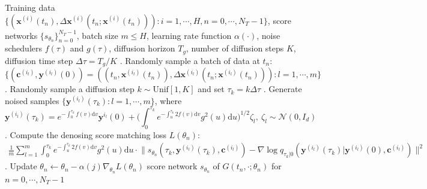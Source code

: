 \documentclass[11pt]{article}
\newcommand{\bx}{\mathbf{x}}
\newcommand{\by}{\mathbf{y}}
\newcommand{\bc}{\mathbf{c}}
\newcommand{\intd}{\mathrm{d}}
\begin{document}
\begin{algorithm}[H]
\small
\caption{Training process of the SDE generative model
$\{G(t_n, \cdot; \theta_n): n=0, \cdots, N_T - 1\}$}
\begin{algorithmic}\label{alg: training_process}
    \REQUIRE Training data $\{(\bx^{(i)}(t_n), \Delta\bx^{(i)}(t_n; \bx^{(i)}(t_n))): i=1,\cdots, H, n=0, \cdots, N_T - 1\}$, score networks $\{s_{\theta_n}\}_{n=0}^{N_T - 1}$, batch size $m\le H$, learning rate function $\alpha(\cdot)$, noise schedulers $f(\tau)$ and $g(\tau)$, diffusion horizon $T_g$, number of diffusion steps $K$, diffusion time step $\Delta\tau = T_g/K$
    . Randomly sample a batch of data at $t_n$:
    \vspace{-2mm}
        $$\big\{(\bc^{(i_l)}, \by^{(i_l)}(0)) = ((t_n, \bx^{(i_l)}(t_n)), \Delta\bx^{(i_l)}(t_n; \bx^{(i_l)}(t_n))): l=1,\cdots, m\big\}$$
    \vspace{-7mm}
    . Randomly sample a diffusion step $k\sim \text{Unif}[1, K]$ and set $\tau_k = k\Delta\tau$
    . Generate noised samples $\{\by^{(i_l)}(\tau_k): l=1,\cdots, m\}$, where
    \vspace{-3mm}
    \[\by^{(i_l)}(\tau_k) = e^{-\int_0^{\tau_k} f(v)\intd v}\by^{i_l}(0) + \bigg(\int_{0}^{\tau_k} e^{-\int_u^{\tau_k} 2f(v)\intd v}g^2(u) \intd u\bigg)^{1/2}\zeta_l,\ \zeta_l\sim\mathcal{N}(0, I_d)
    \]
    \vspace{-5mm}
    . Compute the denosing score matching loss $L(\theta_n)$\footnotemark:
    \vspace{-2mm}
    \begin{align*}
    \frac{1}{m}\sum_{l=1}^m \int_{0}^{\tau_k} e^{-\int_u^{\tau_k} 2f(v)\intd v}g^2(u) \intd u\cdot\big\| s_{\theta_n}(\tau_k, \by^{(i_l)}(\tau_k), \bc^{(i_l)}) - \nabla\log q_{\tau_k|0}(\by^{(i_l)}(\tau_k) | \by^{(i_l)}(0), \bc^{(i_l)})\big\|^2
    \end{align*}
    \vspace{-4mm}
    . Update $\theta_n \leftarrow \theta_n - \alpha(j)\nabla_{\theta_n} L(\theta_n)$
    \ENDFOR
    \ENDFOR
    \RETURN score network $s_{\theta_n}$ of $G(t_n, \cdot; \theta_n)$ for $n=0, \cdots, N_T-1$
\end{algorithmic}
\end{algorithm}
\end{document}
